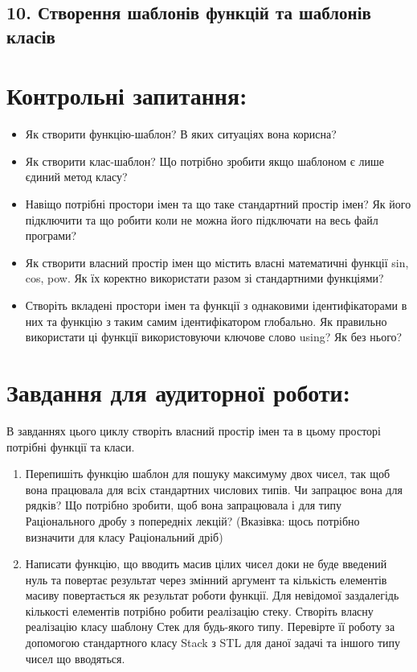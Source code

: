 \documentclass[]{article}
\date{}
\begin{document}
\newpage
\subsection{10. Створення шаблонів функцій та шаблонів класів}
\setcounter{subsection}{1}

\section{Контрольні запитання:}
\begin{itemize}
\item
Як створити функцію-шаблон? В яких ситуаціях вона корисна?
\item
Як створити клас-шаблон? Що потрібно зробити якщо шаблоном є лише
єдиний метод класу?
\item
  Навіщо потрібні простори імен та що таке стандартний простір імен? Як
  його підключити та що робити коли не можна його підключати на весь
  файл програми?
\item
  Як створити власний простір імен що містить власні математичні функції
  sin, cos, pow. Як їх коректно використати разом зі стандартними
  функціями?
\item
  Створіть вкладені простори імен та функції з однаковими
  ідентифікаторами в них та функцію з таким самим ідентифікатором
  глобально. Як правильно використати ці функції використовуючи ключове
  слово using? Як без нього?
\end{itemize}

\section{Завдання для аудиторної роботи:}
В завданнях цього циклу створіть власний простір імен та в цьому просторі
потрібні функції та класи.  

\begin{enumerate}
\def\labelenumi{\arabic{enumi})}

\item
  Перепишіть функцію шаблон для пошуку максимуму двох чисел,
  так щоб вона працювала для всіх стандартних числових типів.
Чи запрацює вона для рядків?
Що потрібно зробити, щоб вона запрацювала і для типу
Раціонального дробу з попередніх лекцій?
(Вказівка: щось потрібно визначити для класу Раціональний дріб)

\item
 Написати функцію, що вводить масив цілих чисел доки не буде введений нуль
та повертає результат через змінний аргумент та
кількість елементів масиву повертається як результат роботи функції.
Для невідомої заздалегідь кількості елементів потрібно робити реалізацію стеку.
Створіть власну реалізацію класу шаблону Стек для будь-якого типу. Перевірте її роботу за
допомогою стандартного класу Stack з STL для даної задачі та іншого типу чисел що вводяться.


\end{enumerate}
\end{document}
